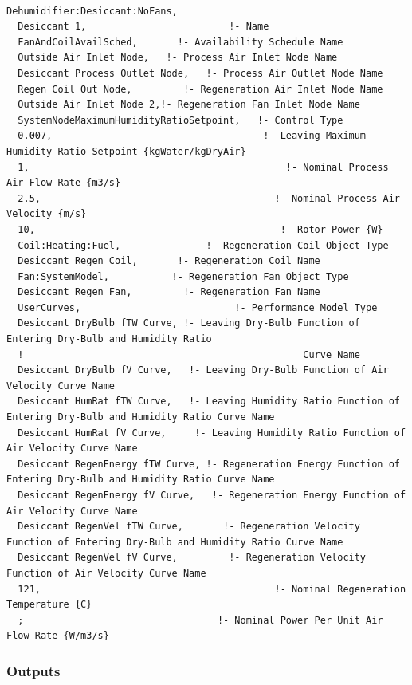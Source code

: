 \begin{lstlisting}

Dehumidifier:Desiccant:NoFans,
  Desiccant 1,                         !- Name
  FanAndCoilAvailSched,       !- Availability Schedule Name
  Outside Air Inlet Node,   !- Process Air Inlet Node Name
  Desiccant Process Outlet Node,   !- Process Air Outlet Node Name
  Regen Coil Out Node,         !- Regeneration Air Inlet Node Name
  Outside Air Inlet Node 2,!- Regeneration Fan Inlet Node Name
  SystemNodeMaximumHumidityRatioSetpoint,   !- Control Type
  0.007,                                     !- Leaving Maximum Humidity Ratio Setpoint {kgWater/kgDryAir}
  1,                                             !- Nominal Process Air Flow Rate {m3/s}
  2.5,                                         !- Nominal Process Air Velocity {m/s}
  10,                                           !- Rotor Power {W}
  Coil:Heating:Fuel,               !- Regeneration Coil Object Type
  Desiccant Regen Coil,       !- Regeneration Coil Name
  Fan:SystemModel,           !- Regeneration Fan Object Type
  Desiccant Regen Fan,         !- Regeneration Fan Name
  UserCurves,                           !- Performance Model Type
  Desiccant DryBulb fTW Curve, !- Leaving Dry-Bulb Function of Entering Dry-Bulb and Humidity Ratio
  !                                                 Curve Name
  Desiccant DryBulb fV Curve,   !- Leaving Dry-Bulb Function of Air Velocity Curve Name
  Desiccant HumRat fTW Curve,   !- Leaving Humidity Ratio Function of Entering Dry-Bulb and Humidity Ratio Curve Name
  Desiccant HumRat fV Curve,     !- Leaving Humidity Ratio Function of Air Velocity Curve Name
  Desiccant RegenEnergy fTW Curve, !- Regeneration Energy Function of Entering Dry-Bulb and Humidity Ratio Curve Name
  Desiccant RegenEnergy fV Curve,   !- Regeneration Energy Function of Air Velocity Curve Name
  Desiccant RegenVel fTW Curve,       !- Regeneration Velocity Function of Entering Dry-Bulb and Humidity Ratio Curve Name
  Desiccant RegenVel fV Curve,         !- Regeneration Velocity Function of Air Velocity Curve Name
  121,                                         !- Nominal Regeneration Temperature {C}
  ;                                  !- Nominal Power Per Unit Air Flow Rate {W/m3/s}
\end{lstlisting}

\subsubsection{Outputs}\label{outputs-008}

